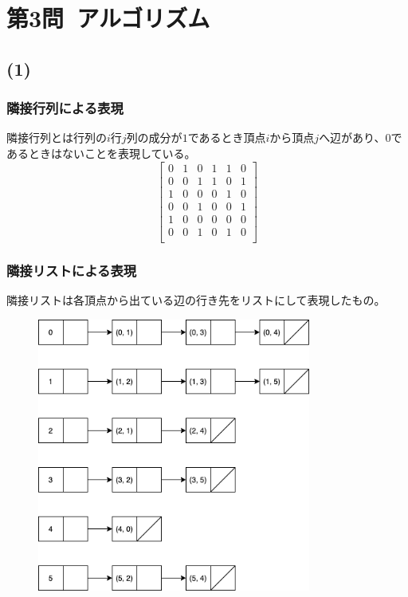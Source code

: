 \documentclass[a4paper,12pt,xelatex,ja=standard]{bxjsarticle}
\begin{document}
\section*{第3問\ アルゴリズム}
\subsection*{(1)}
  \subsubsection*{隣接行列による表現}
  隣接行列とは行列の$i$行$j$列の成分が$1$であるとき頂点$i$から頂点$j$へ辺があり、$0$であるときはないことを表現している。
  \[
    \begin{bmatrix}
      0 & 1 & 0 & 1 & 1 & 0 \\
      0 & 0 & 1 & 1 & 0 & 1 \\
      1 & 0 & 0 & 0 & 1 & 0 \\
      0 & 0 & 1 & 0 & 0 & 1 \\
      1 & 0 & 0 & 0 & 0 & 0 \\
      0 & 0 & 1 & 0 & 1 & 0 \\
    \end{bmatrix}
  \]

  \subsubsection*{隣接リストによる表現}
  隣接リストは各頂点から出ている辺の行き先をリストにして表現したもの。
  \begin{figure}[H]
    \centering
    \includegraphics[width=9cm]{images/adjacency_list.png}
  \end{figure}
\end{document}
